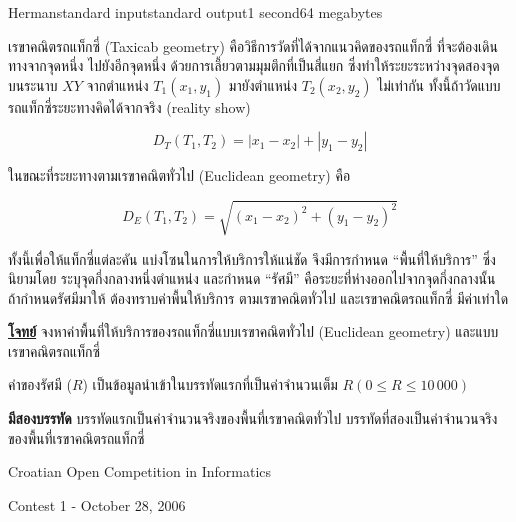 \documentclass[11pt,a4paper]{article}
\begin{document}
\begin{problem}{Herman}{standard input}{standard output}{1 second}{64 megabytes}

เรขาคณิตรถแท็กซี่ (Taxicab geometry) คือวิธีการวัดที่ได้จากแนวคิดของรถแท็กซี่ ที่จะต้องเดินทางจากจุดหนึ่ง ไปยังอีกจุดหนึ่ง ด้วยการเลี้ยวตามมุมตึกที่เป็นสี่แยก  ซึ่งทำให้ระยะระหว่างจุดสองจุด บนระนาบ $XY$ จากตำแหน่ง $T_1(x_1, y_1)$ มายังตำแหน่ง $T_2(x_2, y_2)$ ไม่เท่ากัน ทั้งนี้ถ้าวัดแบบรถแท็กซี่ระยะทางคิดได้จากจริง (reality show)

$$D_T(T_1, T_2) = |x_1 - x_2| + |y_1 - y_2|$$

ในขณะที่ระยะทางตามเรขาคณิตทั่วไป (Euclidean geometry) คือ

$$D_E(T_1, T_2) = \sqrt{(x_1 - x_2)^2 + (y_1 - y_2)^2}$$

ทั้งนี้เพื่อให้แท็กซี่แต่ละคัน แบ่งโซนในการให้บริการให้แน่ชัด จึงมีการกำหนด “พื้นที่ให้บริการ” ซึ่งนิยามโดย ระบุจุดกึ่งกลางหนึ่งตำแหน่ง และกำหนด “รัศมี” คือระยะที่ห่างออกไปจากจุดกึ่งกลางนั้น ถ้ากำหนดรัศมีมาให้ ต้องทราบค่าพื้นให้บริการ ตามเรขาคณิตทั่วไป และเรขาคณิตรถแท็กซี่ มีค่าเท่าใด

\underline{\textbf{โจทย์}} จงหาค่าพื้นที่ให้บริการของรถแท็กซี่แบบเรขาคณิตทั่วไป (Euclidean geometry) และแบบเรขาคณิตรถแท็กซี่

\InputFile

ค่าของรัศมี ($R$) เป็นข้อมูลนำเข้าในบรรทัดแรกที่เป็นค่าจำนวนเต็ม $R (0 \leq R \leq 10\,000)$

\OutputFile

\textbf{มีสองบรรทัด} บรรทัดแรกเป็นค่าจำนวนจริงของพื้นที่เรขาคณิตทั่วไป บรรทัดที่สองเป็นค่าจำนวนจริงของพื้นที่เรขาคณิตรถแท็กซี่

\Examples

\begin{example}
%
%
%
\end{example}

\Source

Croatian Open Competition in Informatics

Contest 1 - October 28, 2006

\end{problem}
\end{document}
